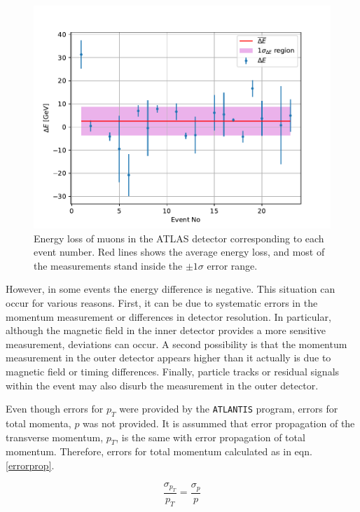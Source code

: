 \begin{figure}[h]
    \centering
    \includegraphics[width=\textwidth]{../figures/EnergyLoss.pdf}
	\caption{Energy loss of muons in the ATLAS detector corresponding to each event number. Red lines shows the average energy loss, and most of the measurements stand inside the $\pm1\sigma$ error range.}
    \label{fig:EnergyLoss}
\end{figure}
\FloatBarrier



However, in some events the energy difference is negative. This situation can occur for various reasons. First, it can be due to systematic errors in the momentum measurement or differences in detector resolution. In particular, although the magnetic field in the inner detector provides a more sensitive measurement, deviations can occur. A second possibility is that the momentum measurement in the outer detector appears higher than it actually is due to magnetic field or timing differences. Finally, particle tracks or residual signals within the event may also disurb the measurement in the outer detector.

Even though errors for $p_T$ were provided by the \texttt{ATLANTIS} program, errors for total momenta, $p$ was not provided. It is assummed that error propagation of the transverse momentum, $p_T$, is the same with error propagation of total momentum. Therefore, errors for total momentum calculated as in eqn.\ref{errorprop}.

\begin{equation}
	\label{errorprop}
	\frac{\sigma_{p_T}}{p_T}=\frac{\sigma_p}{p}
\end{equation}



